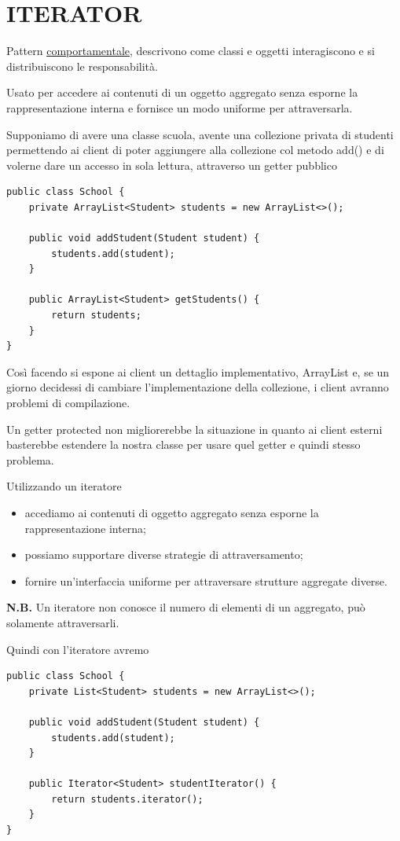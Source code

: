 \chapter{ITERATOR}

Pattern \underline{comportamentale}, descrivono come classi e oggetti interagiscono e si distribuiscono le responsabilità.

Usato per accedere ai contenuti di un oggetto aggregato senza esporne la rappresentazione interna e fornisce un modo uniforme per attraversarla.
\smallskip

Supponiamo di avere una classe scuola, avente una collezione privata di studenti permettendo ai client di poter aggiungere alla collezione col metodo add() e di 
volerne dare un accesso in sola lettura, attraverso un getter pubblico
\begin{lstlisting}
public class School {
    private ArrayList<Student> students = new ArrayList<>();
    
    public void addStudent(Student student) {
        students.add(student);
    }
    
    public ArrayList<Student> getStudents() {
        return students;
    }
}
\end{lstlisting}

Così facendo si espone ai client un dettaglio implementativo, ArrayList e, se un giorno decidessi di cambiare l'implementazione della collezione, i client avranno 
problemi di compilazione.

Un getter protected non migliorerebbe la situazione in quanto ai client esterni basterebbe estendere la nostra classe per usare quel getter e quindi stesso problema.
\smallskip

Utilizzando un iteratore
\begin{itemize}
    \item accediamo ai contenuti di oggetto aggregato senza esporne la rappresentazione interna;
    \item possiamo supportare diverse strategie di attraversamento;
    \item fornire un’interfaccia uniforme per attraversare strutture aggregate diverse.
\end{itemize}

\textbf{N.B.} Un iteratore non conosce il numero di elementi di un aggregato, può solamente attraversarli.
\medskip

Quindi con l'iteratore avremo
\begin{lstlisting}
public class School {
    private List<Student> students = new ArrayList<>();
    
    public void addStudent(Student student) {
        students.add(student);
    }

    public Iterator<Student> studentIterator() {
        return students.iterator();
    }
}
\end{lstlisting}

